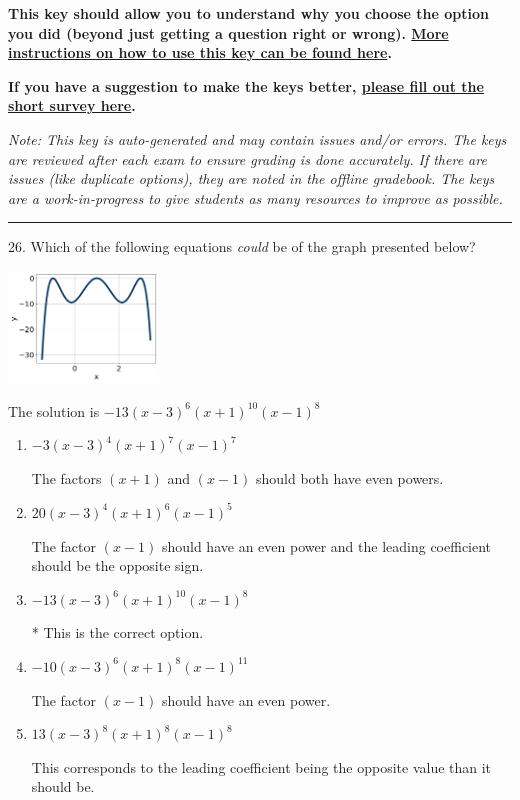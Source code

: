 \documentclass{article}[14pt]
\begin{document}
\textbf{This key should allow you to understand why you choose the option you did (beyond just getting a question right or wrong). \href{https://xronos.clas.ufl.edu/mac1105spring2020/courseDescriptionAndMisc/Exams/LearningFromResults}{More instructions on how to use this key can be found here}.}

\textbf{If you have a suggestion to make the keys better, \href{https://forms.gle/CZkbZmPbC9XALEE88}{please fill out the short survey here}.}

\textit{Note: This key is auto-generated and may contain issues and/or errors. The keys are reviewed after each exam to ensure grading is done accurately. If there are issues (like duplicate options), they are noted in the offline gradebook. The keys are a work-in-progress to give students as many resources to improve as possible.}

\rule{\textwidth}{0.4pt}

26. Which of the following equations \textit{could} be of the graph presented below?
\begin{center} \includegraphics[width=0.3\textwidth]{../Figures/polyGraphToFunctionC.png} \end{center} 

The solution is $ -13(x - 3)^{6} (x + 1)^{10} (x - 1)^{8} $ 

\begin{enumerate}[label=\Alph*.] 
\item $ -3(x - 3)^{4} (x + 1)^{7} (x - 1)^{7} $ 

 The factors $(x + 1)$ and $(x - 1)$ should both have even powers. 
\item $ 20(x - 3)^{4} (x + 1)^{6} (x - 1)^{5} $ 

 The factor $(x - 1)$ should have an even power and the leading coefficient should be the opposite sign. 
\item $ -13(x - 3)^{6} (x + 1)^{10} (x - 1)^{8} $ 

 * This is the correct option. 
\item $ -10(x - 3)^{6} (x + 1)^{8} (x - 1)^{11} $ 

 The factor $(x - 1)$ should have an even power. 
\item $ 13(x - 3)^{8} (x + 1)^{8} (x - 1)^{8} $ 

 This corresponds to the leading coefficient being the opposite value than it should be. 
\end{enumerate} 
 
\end{document}
